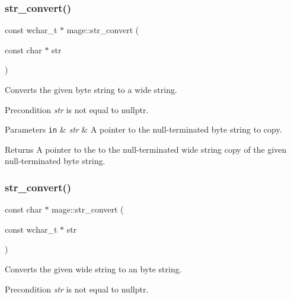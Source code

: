\subsubsection{\texorpdfstring{str\+\_\+convert()}{str\_convert()}\hspace{0.1cm}{\footnotesize\ttfamily [1/4]}}
{\footnotesize\ttfamily const wchar\+\_\+t $\ast$ mage\+::str\+\_\+convert (\begin{DoxyParamCaption}\item[{const char $\ast$}]{str }\end{DoxyParamCaption})}

Converts the given byte string to a wide string.

\begin{DoxyPrecond}{Precondition}
{\itshape str} is not equal to {\ttfamily nullptr}. 
\end{DoxyPrecond}

\begin{DoxyParams}[1]{Parameters}
\mbox{\tt in}  & {\em str} & A pointer to the null-\/terminated byte string to copy. \\
\hline
\end{DoxyParams}
\begin{DoxyReturn}{Returns}
A pointer to the to the null-\/terminated wide string copy of the given null-\/terminated byte string. 
\end{DoxyReturn}
\hypertarget{namespacemage_a93f0e3b596ce1156d1fce19967fc316a}{}\label{namespacemage_a93f0e3b596ce1156d1fce19967fc316a} 
\subsubsection{\texorpdfstring{str\+\_\+convert()}{str\_convert()}\hspace{0.1cm}{\footnotesize\ttfamily [2/4]}}
{\footnotesize\ttfamily const char $\ast$ mage\+::str\+\_\+convert (\begin{DoxyParamCaption}\item[{const wchar\+\_\+t $\ast$}]{str }\end{DoxyParamCaption})}

Converts the given wide string to an byte string.

\begin{DoxyPrecond}{Precondition}
{\itshape str} is not equal to {\ttfamily nullptr}. 
\end{DoxyPrecond}

